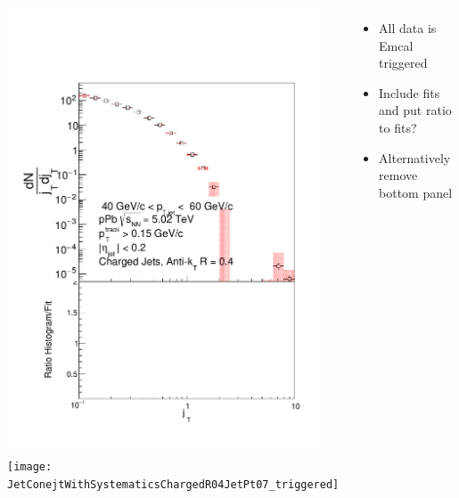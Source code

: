 \documentclass{beamer}
\begin{document}
\begin{frame}
\begin{columns}
\includegraphics[width=0.95\textwidth]{JetConejtWithSystematicsChargedR04JetPt04_triggered} \\
\texttt{[image: JetConejtWithSystematicsChargedR04JetPt07\_triggered]} \\
\begin{itemize}
\item All data is Emcal triggered
\item Include fits and put ratio to fits?
\item Alternatively remove bottom panel
\end{itemize}
\end{columns}
\end{frame}
\end{document}
